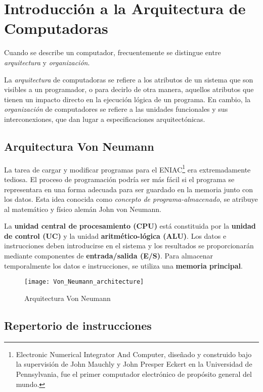 \section{Introducción a la Arquitectura de Computadoras}

Cuando se describe un computador, frecuentemente se distingue entre \textit{arquitectura} y \textit{organización}.

La \textit{arquitectura} de computadoras se refiere a los atributos de un sistema que son visibles a un programador, o para decirlo de otra manera, aquellos atributos que tienen un impacto directo en la ejecución lógica de un programa.
En cambio, la \textit{organización} de computadores se refiere a las unidades funcionales y sus interconexiones, que dan lugar a especificaciones arquitectónicas.

\subsection{Arquitectura Von Neumann}

La tarea de cargar y modificar programas para el ENIAC\footnote{Electronic Numerical Integrator And Computer, diseñado y construido bajo la supervisión de John Mauchly y John Presper Eckert en la Universidad de Pennsylvania, fue el primer computador electrónico de propósito general del mundo.} era extremadamente tediosa. El proceso de programación podría ser más fácil si el programa se representara en una forma adecuada para ser guardado en la memoria junto con los datos.
Esta idea conocida como \textit{concepto de programa-almacenado}, se atribuye al matemático y físico alemán John von Neumann.

La \textbf{unidad central de procesamiento (CPU)} está constituida por la \textbf{unidad de control (UC)} y la unidad \textbf{aritmético-lógica (ALU)}.
Los datos e instrucciones deben introducirse en el sistema y los resultados se proporcionarán mediante componentes de \textbf{entrada/salida (E/S)}.
Para almacenar temporalmente los datos e instrucciones, se utiliza una \textbf{memoria principal}.

\begin{figure}[h]
  \centering
  \texttt{[image: Von\_Neumann\_architecture]}
  \caption{Arquitectura Von Neumann}
\end{figure}
\subsection{Repertorio de instrucciones}

